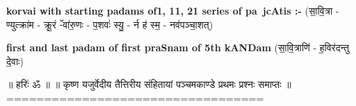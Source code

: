 \documentclass[17pt]{extarticle}
\begin{document}
\textbf{korvai with starting padams of1, 11, 21 series of pa~jcAtis :-} \newline
(सा॒वि॒त्रा - ण्युत्क्रा॑म - क्रू॒रं -ॅवा॑रु॒णः - प॒शवः॑ स्यु॒ - र्न ह॑ स्म॒ - नव॑पञ्चा॒शत्) \newline

\textbf{first and last padam of first praSnam of 5th kANDam} \newline
(सा॒वि॒त्राणि॑ - ह॒विर॑दन्तु दे॒वाः) \newline 


॥ हरिः॑ ॐ ॥
॥ कृष्ण यजुर्वेदीय तैत्तिरीय संहितायां पञ्चमकाण्डे प्रथमः प्रश्नः समाप्तः ॥
================================== \newline
\pagebreak
\pagebreak
        
\end{document}
